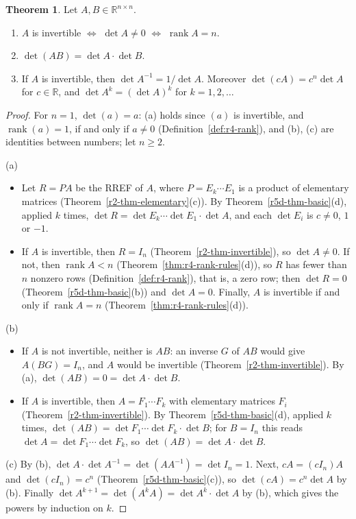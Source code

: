 \documentclass[12pt]{article}
\newcommand{\R}{\mathbb R}
\DeclareMathOperator{\rank}{rank}
\theoremstyle{definition}
\newtheorem{theorem}{Theorem}
\begin{document}
\begin{theorem}\label{r5d-thm-product}
Let \(A,B\in\R^{n\times n}\).
\begin{enumerate}
\item \(A\) is invertible \(\Leftrightarrow\) \(\det A\ne0\) \(\Leftrightarrow\) \(\rank A=n\).
\item \(\det(AB)=\det A\cdot\det B\).
\item If \(A\) is invertible, then \(\det A^{-1}=1/\det A\). Moreover \(\det(cA)=c^n\det A\) for
\(c\in\R\), and \(\det A^k=(\det A)^k\) for \(k=1,2,\dots\)
\end{enumerate}
\end{theorem}
\begin{proof}
For \(n=1\), \(\det(a)=a\): (a) holds since \((a)\) is invertible, and \(\rank(a)=1\), if and only if \(a\ne0\)
(Definition~\ref{def:r4-rank}), and (b), (c) are identities between numbers; let \(n\geqslant2\).

(a)
\begin{itemize}
\item Let \(R=PA\) be the RREF of \(A\), where \(P=E_k\cdots E_1\) is a product of elementary matrices
(Theorem~\ref{r2-thm-elementary}(c)). By Theorem~\ref{r5d-thm-basic}(d), applied \(k\) times,
\(\det R=\det E_k\cdots\det E_1\cdot\det A\), and each \(\det E_i\) is \(c\ne0\), \(1\) or \(-1\).
\item If \(A\) is invertible, then \(R=I_n\) (Theorem~\ref{r2-thm-invertible}), so \(\det A\ne0\). If
not, then \(\rank A<n\) (Theorem~\ref{thm:r4-rank-rules}(d)), so \(R\) has fewer than \(n\) nonzero
rows (Definition~\ref{def:r4-rank}), that is, a zero row; then \(\det R=0\)
(Theorem~\ref{r5d-thm-basic}(b)) and \(\det A=0\). Finally, \(A\) is invertible if and only if
\(\rank A=n\) (Theorem~\ref{thm:r4-rank-rules}(d)).
\end{itemize}

(b)
\begin{itemize}
\item If \(A\) is not invertible, neither is \(AB\): an inverse \(G\) of \(AB\) would give
\(A(BG)=I_n\), and \(A\) would be invertible (Theorem~\ref{r2-thm-invertible}). By (a),
\(\det(AB)=0=\det A\cdot\det B\).
\item If \(A\) is invertible, then \(A=F_1\cdots F_k\) with elementary matrices \(F_i\)
(Theorem~\ref{r2-thm-invertible}). By Theorem~\ref{r5d-thm-basic}(d), applied \(k\) times,
\(\det(AB)=\det F_1\cdots\det F_k\cdot\det B\); for \(B=I_n\) this reads
\(\det A=\det F_1\cdots\det F_k\), so \(\det(AB)=\det A\cdot\det B\).
\end{itemize}

(c) By (b), \(\det A\cdot\det A^{-1}=\det(AA^{-1})=\det I_n=1\). Next, \(cA=(cI_n)A\) and \(\det(cI_n)=c^n\)
(Theorem~\ref{r5d-thm-basic}(c)), so \(\det(cA)=c^n\det A\) by (b). Finally
\(\det A^{k+1}=\det(A^kA)=\det A^k\cdot\det A\) by (b), which gives the powers by induction on \(k\).
\end{proof}
\end{document}
